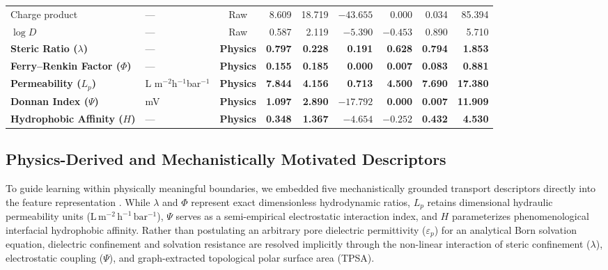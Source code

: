 \documentclass[10pt,twocolumn]{article}
\begin{document}
\begin{table}[htbp]
{\begin{tabular}{llcrrrrrr}
Charge product & --- & Raw & 8.609 & 18.719 & $-43.655$ & 0.000 & 0.034 & 85.394 \\
$\log D$ & --- & Raw & 0.587 & 2.119 & $-5.390$ & $-0.453$ & 0.890 & 5.710 \\
\textbf{Steric Ratio ($\lambda$)} & --- & \textbf{Physics} & \textbf{0.797} & \textbf{0.228} & \textbf{0.191} & \textbf{0.628} & \textbf{0.794} & \textbf{1.853} \\
\textbf{Ferry--Renkin Factor ($\Phi$)} & --- & \textbf{Physics} & \textbf{0.155} & \textbf{0.185} & \textbf{0.000} & \textbf{0.007} & \textbf{0.083} & \textbf{0.881} \\
\textbf{Permeability ($L_p$)} & L m$^{-2}$h$^{-1}$bar$^{-1}$ & \textbf{Physics} & \textbf{7.844} & \textbf{4.156} & \textbf{0.713} & \textbf{4.500} & \textbf{7.690} & \textbf{17.380} \\
\textbf{Donnan Index ($\Psi$)} & mV & \textbf{Physics} & \textbf{1.097} & \textbf{2.890} & \textbf{$-17.792$} & \textbf{0.000} & \textbf{0.007} & \textbf{11.909} \\
\textbf{Hydrophobic Affinity ($H$)} & --- & \textbf{Physics} & \textbf{0.348} & \textbf{1.367} & \textbf{$-4.654$} & \textbf{$-0.252$} & \textbf{0.432} & \textbf{4.530} \\
\bottomrule
\end{tabular}%
}
\end{table}

\subsection{Physics-Derived and Mechanistically Motivated Descriptors}
\label{subsec:physics}

To guide learning within physically meaningful boundaries, we embedded five mechanistically grounded transport descriptors directly into the feature representation \cite{yangaliquintanilla2009,renkin1954,bowen2002}. While $\lambda$ and $\Phi$ represent exact dimensionless hydrodynamic ratios, $L_p$ retains dimensional hydraulic permeability units ($\mathrm{L\,m^{-2}\,h^{-1}\,bar^{-1}}$), $\Psi$ serves as a semi-empirical electrostatic interaction index, and $H$ parameterizes phenomenological interfacial hydrophobic affinity. Rather than postulating an arbitrary pore dielectric permittivity ($\varepsilon_p$) for an analytical Born solvation equation, dielectric confinement and solvation resistance are resolved implicitly through the non-linear interaction of steric confinement ($\lambda$), electrostatic coupling ($\Psi$), and graph-extracted topological polar surface area (TPSA).
\end{document}
